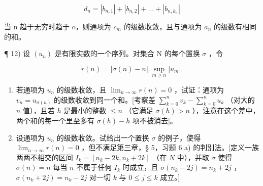 \[
d _ {n} = \left| b _ {n, 1} \right| + \left| b _ {n, 2} \right| + \dots + \left| b _ {n, k _ {n}} \right|
\]

当 n 趋于无穷时趋于 o，则通项为 \(c_{m}\) 的级数收敛，且与通项为 \(a_{n}\) 的级数有相同的和。

¶ 12) 设 \((u_n)\) 是有限实数的一个序列。对集合 N 的每个置换 \(\sigma\) ，令

\[
r (n) = | \sigma (n) - n |. \sup _ {m \geqslant n} | u _ {m} |.
\]

\begin{enumerate}
\def\labelenumi{\alph{enumi})}
\item
若通项为 \(u_n\) 的级数收敛，且 \(\lim_{n \to \infty} r(n) = 0\) ，试证：通项为 \(v_n = u_{\sigma(n)}\) 的级数收敛到同一个和。{[}考察差 \(\sum_{k=0}^{n} v_k - \sum_{k=0}^{n} u_k\) （对大的 \(n\) 值），且若 \(h\) 是最小的整数 \(\leqslant n\) （它满足 \(\sigma(h) > n\) ），注意在这个差中，两个和的每一个里至多有 \(\sigma(h) - h\) 项不被消去{]}。
\item
设通项为 \(u_n\) 的级数收敛。试给出一个置换 \(\sigma\) 的例子，使得 \(\lim_{n \to \infty} r(n) = 0\) ，但不满足第三章，§ 5，习题 6 a) 的判别法。{[}定义一族两两不相交的区间 \(I_k = [n_k - 2k, n_k + 2k]\) （在 \(N\) 中），并取 \(\sigma\) 使得 \(\sigma(n) = n\) 每当 \(n\) 不属于任何 \(I_k\) 时成立，且 \(\sigma(n_k - 2j) = n_k + 2j\) ， \(\sigma(n_k + 2j) = n_k - 2j\) 对一切 \(k\) 与 \(0 \leqslant j \leqslant k\) 成立。{]}
\end{enumerate}

